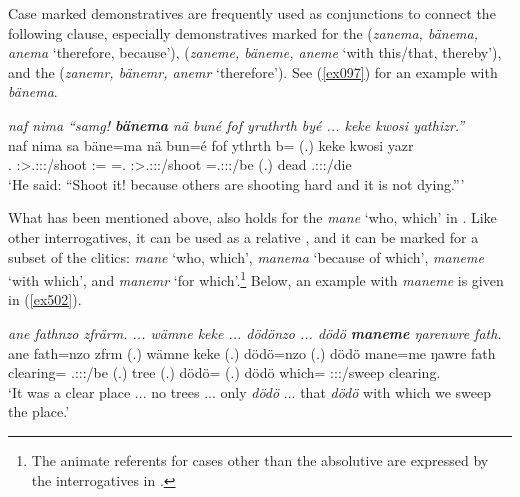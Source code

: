 Case marked demonstratives are frequently used as conjunctions to connect the following clause, especially demonstratives marked for the  (\emph{zanema, bänema, anema} `therefore, because'),  (\emph{zaneme, bäneme, aneme} `with this/that, thereby'), and the  (\emph{zanemr, bänemr, anemr} `therefore'). See (\ref{ex097}) for an example with \emph{bänema}.

\begin{exe}
	\ex \emph{naf nima ``samg! \textbf{bänema} nä buné fof yruthrth byé ... keke kwosi yathizr.''}\\
	\gll naf nima sa bäne=ma {nä bun=é} fof ythrth b= (.) keke kwosi yazr\\
	\Tsg.\Erg{} \Quot{} \Ssg:\Sbj>\Tsg.\Masc:\Obj:\Imp:\Pfv/shoot \Dem:\Med=\Char{} {\Indf=\Erg.\Nsg} \Emph{} \Stpl:\Sbj>\Tsg.\Masc:\Obj:\Nonpast:\Ipfv/shoot \Med=\Tsg.\Masc:\Sbj:\Nonpast:\Ipfv/be (.) \Neg{} dead \Tsg.\Masc:\Sbj:\Nonpast:\Ipfv/die\\
	\trans `He said: ``Shoot it! because others are shooting hard and it is not dying.'''\\ 
	\label{ex097}
\end{exe}

What has been mentioned above, also holds for the  \emph{mane} `who, which' in . Like other interrogatives, it can be used as a relative , and it can be marked for a subset of the  clitics:  \emph{mane} `who, which',  \emph{manema} `because of which',  \emph{maneme} `with which', and  \emph{manemr} `for which'.\footnote{The animate referents for cases other than the absolutive are expressed by the interrogatives in .} Below, an example with \emph{maneme} is given in (\ref{ex502}).%

\begin{exe}
	\ex \emph{ane fathnzo zfrärm. ... wämne keke ... dödönzo ... dödö \textbf{maneme} ŋarenwre fath.}
	\gll ane fath=nzo zfrm (.) wämne keke (.) dödö=nzo (.) dödö mane=me ŋawre fath\\
	\Dem{} clearing=\Only{} \Tsg.\F:\Sbj:\Pst:\Dur/be (.) tree \Neg{} (.) dödö=\Only{} (.) dödö which=\Ins{} \Fpl:\Sbj:\Nonpast:\Ipfv/sweep clearing.\\
	\trans `It was a clear place ... no trees ... only \emph{dödö} ... that \emph{dödö} with which we sweep the place.' 
	\label{ex502}
\end{exe}

